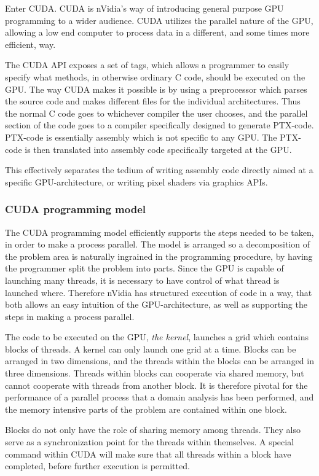 Enter CUDA. CUDA is nVidia's way of introducing general purpose GPU programming to a wider audience. CUDA utilizes the parallel nature of the GPU, allowing a low end computer to process data in a different, and some times more efficient, way.

The CUDA API exposes a set of tags, which allows a programmer to easily specify what methods, in otherwise ordinary C code, should be executed on the GPU. The way CUDA makes it possible is by using a preprocessor which parses the source code and makes different files for the individual architectures. Thus the normal C code goes to whichever compiler the user chooses, and the parallel section of the code goes to a compiler specifically designed to generate PTX-code. PTX-code is essentially assembly which is not specific to any GPU. The PTX-code is then translated into assembly code specifically targeted at the GPU.

This effectively separates the tedium of writing assembly code directly aimed at a specific GPU-architecture, or writing pixel shaders via graphics APIs.

\subsubsection{CUDA programming model}
The CUDA programming model efficiently supports the steps needed to be taken, in order to make a process parallel. The model is arranged so a decomposition of the problem area is naturally ingrained in the programming procedure, by having the programmer split the problem into parts. Since the GPU is capable of launching many threads, it is necessary to have control of what thread is launched where. Therefore nVidia has structured execution of code in a way, that both allows an easy intuition of the GPU-architecture, as well as supporting the steps in making a process parallel.

The code to be executed on the GPU, \emph{the kernel}, launches a grid which contains blocks of threads. A kernel can only launch one grid at a time. Blocks can be arranged in two dimensions, and the threads within the blocks can be arranged in three dimensions. Threads within blocks can cooperate via shared memory, but cannot cooperate with threads from another block. It is therefore pivotal for the performance of a parallel process that a domain analysis has been performed, and the memory intensive parts of the problem are contained within one block.

Blocks do not only have the role of sharing memory among threads. They also serve as a synchronization point for the threads within themselves. A special command within CUDA will make sure that all threads within a block have completed, before further execution is permitted.

